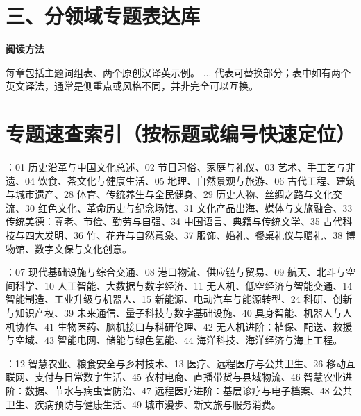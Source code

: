 \documentclass[a4paper,11pt,UTF8,fontset=none]{ctexart}
\begin{document}
\section{三、分领域专题表达库}

\begin{tcolorbox}[enhanced,breakable,boxrule=0.35pt,colback=VeryPaleBlue,colframe=AccentBlue!40,left=7pt,right=7pt,top=4pt,bottom=4pt,borderline west={2pt}{0pt}{AccentBlue},before skip=4pt,after skip=6pt]
{\bfseries\color{AccentBlue} 阅读方法}\par\vspace{1pt}
\noindent 每章包括主题词组表、两个原创汉译英示例。{\color{AccentBlue} ...} 代表可替换部分；表中如有两个英文译法，通常是侧重点或风格不同，并非完全可以互换。\par


\end{tcolorbox}

\section{专题速查索引（按标题或编号快速定位）}

：01 历史沿革与中国文化总述、02 节日习俗、家庭与礼仪、03 艺术、手工艺与非遗、04 饮食、茶文化与健康生活、05 地理、自然景观与旅游、06 古代工程、建筑与城市遗产、28 体育、传统养生与全民健身、29 历史人物、丝绸之路与文化交流、30 红色文化、革命历史与纪念场馆、31 文化产品出海、媒体与文旅融合、33 传统美德：尊老、节俭、勤劳与自强、34 中国语言、典籍与传统文学、35 古代科技与四大发明、36 竹、花卉与自然意象、37 服饰、婚礼、餐桌礼仪与赠礼、38 博物馆、数字文保与文化创意。\par

：07 现代基础设施与综合交通、08 港口物流、供应链与贸易、09 航天、北斗与空间科学、10 人工智能、大数据与数字经济、11 无人机、低空经济与智能交通、14 智能制造、工业升级与机器人、15 新能源、电动汽车与能源转型、24 科研、创新与知识产权、39 未来通信、量子科技与数字基础设施、40 具身智能、机器人与人机协作、41 生物医药、脑机接口与科研伦理、42 无人机进阶：植保、配送、救援与空域、43 智能电网、储能与绿色氢能、44 海洋科技、海洋经济与海上工程。\par

：12 智慧农业、粮食安全与乡村技术、13 医疗、远程医疗与公共卫生、26 移动互联网、支付与日常数字生活、45 农村电商、直播带货与县域物流、46 智慧农业进阶：数据、节水与病虫害防治、47 远程医疗进阶：基层诊疗与电子档案、48 公共卫生、疾病预防与健康生活、49 城市漫步、新文旅与服务消费。\par
\end{document}
